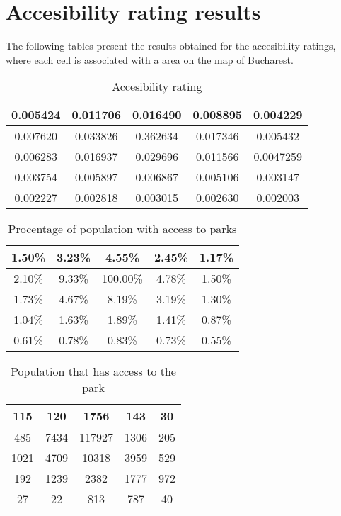 \chapter{Accesibility rating results}
\label{chap:acc-rating}

The following tables present the results obtained for the accesibility ratings, where each cell is associated with a area on the map of Bucharest.

\begin{center}
\begin{table}[htb]
  \caption{Accesibility rating}
  \begin{tabular}{|c|c|c|c|c|}
	\hline
   	0.005424 	& 	0.011706	& 	0.016490	&	0.008895	& 	0.004229 \\
	\hline
   	0.007620 	& 	0.033826	& 	0.362634	&	0.017346	& 	0.005432 \\
	\hline
   	0.006283 	& 	0.016937	& 	0.029696	&	0.011566	& 	0.0047259 \\
	\hline
   	0.003754 	& 	0.005897	& 	0.006867	&	0.005106	& 	0.003147 \\
	\hline
   	0.002227 	& 	0.002818	& 	0.003015	&	0.002630	& 	0.002003 \\
	\hline
  \end{tabular}
  \label{table:reports-0}
\end{table}
\end{center}


\begin{center}
\begin{table}[htb]
  \caption{Procentage of population with access to parks}
  \begin{tabular}{|c|c|c|c|c|}
	\hline
	1.50\%		&	3.23\%		&	4.55\%		&	2.45\%		&	1.17\% \\
	\hline
	2.10\%		&	9.33\%		&	100.00\%	&	4.78\%		&	1.50\% \\
	\hline
	1.73\%		&	4.67\%		&	8.19\%		&	3.19\%		&	1.30\% \\
	\hline
	1.04\%		&	1.63\%		&	1.89\%		&	1.41\%		&	0.87\% \\
	\hline
	0.61\%		&	0.78\%		&	0.83\%		&	0.73\%		&	0.55\% \\
	\hline
  \end{tabular}
  \label{table:reports-1}
\end{table}
\end{center}


\begin{center}
\begin{table}[htb]
  \caption{Population that has access to the park}
  \begin{tabular}{|c|c|c|c|c|}
	\hline
	115		&	120		&	1756		&	143		&	30 \\
	\hline
	485		&	7434		&	117927		&	1306		&	205 \\
	\hline
	1021		&	4709		&	10318		&	3959		&	529 \\
	\hline
	192		&	1239		&	2382		&	1777		&	972 \\
	\hline
	27		&	22		&	813		&	787		&	40 \\
	\hline
  \end{tabular}
  \label{table:reports-2}
\end{table}
\end{center}

